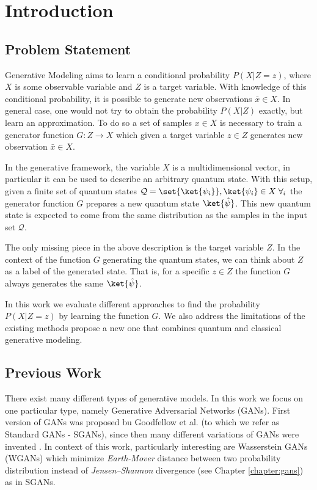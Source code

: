\chapter{Introduction} \label{chapter:introduction}
\section{Problem Statement}
Generative Modeling aims to learn a conditional probability $P(X|Z = z)$, where $X$ is some observable variable and $Z$ is a target variable. With knowledge of this conditional probability, it is possible to generate new observations $\bar{x} \in X$. In general case, one would not try to obtain the probability $P(X|Z)$ exactly, but learn an approximation. To do so a set of samples $x \in X$ is necessary to train a generator function $G: Z \to X$ which given a target variable $z \in Z$ generates new observation $\bar{x} \in X$. 

In the generative framework, the variable $X$ is a multidimensional vector, in particular it can be used to describe an arbitrary quantum state. With this setup, given a finite set of quantum states $\mathcal{Q} = \set{\ket{\psi_i}}, \ket{\psi_i} \in X\; \forall_i$ the generator function $G$ prepares a new quantum state $\ket{\hat{\psi}}$. This new quantum state is expected to come from the same distribution as the samples in the input set $\mathcal{Q}$.

The only missing piece in the above description is the target variable $Z$. In
the context of the function $G$ generating the quantum states, we can think
about $Z$ as a label of the generated state. That is, for a specific $z \in Z$
the function $G$ always generates the same $\ket{\hat{\psi}}$.

In this work we evaluate different approaches to find the probability $P(X|Z =
z)$ by learning the function $G$. We also address the limitations of the
existing methods propose a new one that combines quantum and classical
generative modeling.
\section{Previous Work}
There exist many different types of generative models. In this work we focus on
one particular type, namely Generative Adversarial Networks (GANs). First
version of GANs was proposed bu Goodfellow et al.
\cite{goodfellow2014generative} (to which we refer as Standard GANs - SGANs),
since then many different variations of GANs were invented
\cite{mirza2014conditional}\cite{karras2019stylebased}\cite{radford2016unsupervised}.
In context of this work, particularly interesting are Wasserstein GANs
(WGANs)\cite{arjovsky2017wasserstein} which minimize \textit{Earth-Mover} distance
between two probability distribution instead of
\textit{Jensen–Shannon} divergence (see Chapter \ref{chapter:gans}) as in SGANs.

